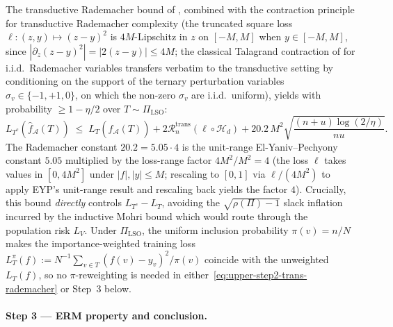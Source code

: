 \documentclass[11pt,a4paper]{article}
\theoremstyle{plain}
\theoremstyle{definition}
\theoremstyle{remark}
\newcommand{\Acal}{\mathcal{A}}
\newcommand{\Hcal}{\mathcal{H}}
\begin{document}
The transductive Rademacher bound of
\citet[][Theorem~1]{ElYanivPechyony2006}, combined with the
contraction principle for transductive Rademacher complexity
\citep[][\S 3, Lemma~1]{ElYanivPechyony2006} (the truncated
square loss $\ell : (z, y) \mapsto (z - y)^2$ is $4M$-Lipschitz
in $z$ on $[-M, M]$ when $y \in [-M, M]$, since $|\partial_z
(z-y)^2| = |2(z-y)| \le 4M$; the classical Talagrand contraction
of \citet{Talagrand1996concentration} for i.i.d.\ Rademacher
variables transfers verbatim to the transductive setting by
conditioning on the support of the ternary perturbation
variables $\sigma_v \in \{-1, +1, 0\}$, on which the non-zero
$\sigma_v$ are i.i.d.\ uniform), yields with probability
$\geq 1 - \eta/2$ over $T \sim \Pi_{\mathrm{LSO}}$:
\begin{equation}
    L_{T^c}(\hat f_\Acal(T))
    \;\leq\; L_T(\hat f_\Acal(T))
        + 2 \mathcal{R}^{\mathrm{trans}}_n(\ell \circ \Hcal_d)
        + 20.2\, M^2 \sqrt{\frac{(n + u) \log(2/\eta)}{n u}}.
    \label{eq:upper-step2-trans-rademacher}
\end{equation}
The Rademacher constant $20.2 = 5.05 \cdot 4$ is the unit-range
El-Yaniv--Pechyony constant $5.05$ multiplied by the loss-range
factor $4M^2/M^2 = 4$ (the loss $\ell$ takes values in $[0, 4M^2]$
under $|f|, |y| \le M$; rescaling to $[0, 1]$ via $\ell/(4M^2)$ to
apply EYP's unit-range result and rescaling back yields the factor
$4$).  Crucially, this bound \emph{directly} controls
$L_{T^c} - L_T$, avoiding the $\sqrt{\rho(\Pi) - 1}$ slack inflation
incurred by the inductive Mohri bound
\citep[][Theorem~3.7]{Mohri2018book} which would route through the
population risk $L_V$. Under $\Pi_{\mathrm{LSO}}$, the uniform
inclusion probability $\pi(v) = n/N$ makes the importance-weighted
training loss $L_T^\pi(f) := N^{-1}\sum_{v \in T}(f(v)-y_v)^2/\pi(v)$
coincide with the unweighted $L_T(f)$, so no $\pi$-reweighting is
needed in either~\eqref{eq:upper-step2-trans-rademacher} or
Step~3 below.

\paragraph{Step 3 — ERM property and conclusion.}
\end{document}
